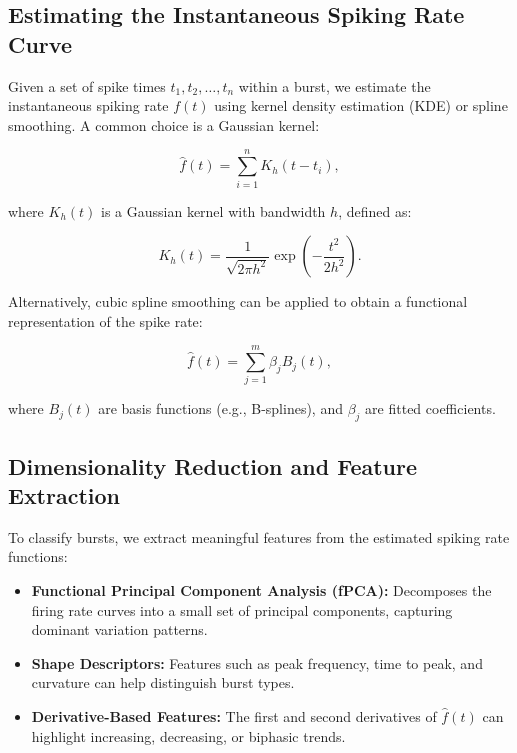 \documentclass[a4paper,9pt]{extarticle}
\begin{document}
\subsection{Estimating the Instantaneous Spiking Rate Curve}

Given a set of spike times \( t_1, t_2, \dots, t_n \) within a burst, we estimate the instantaneous spiking rate \( f(t) \) using kernel density estimation (KDE) or spline smoothing. A common choice is a Gaussian kernel:

\begin{equation}
    \hat{f}(t) = \sum_{i=1}^{n} K_h (t - t_i),
\end{equation}

where \( K_h (t) \) is a Gaussian kernel with bandwidth \( h \), defined as:

\begin{equation}
    K_h (t) = \frac{1}{\sqrt{2\pi h^2}} \exp\left(-\frac{t^2}{2h^2}\right).
\end{equation}

Alternatively, cubic spline smoothing can be applied to obtain a functional representation of the spike rate:

\begin{equation}
    \hat{f}(t) = \sum_{j=1}^{m} \beta_j B_j(t),
\end{equation}

where \( B_j(t) \) are basis functions (e.g., B-splines), and \( \beta_j \) are fitted coefficients.

\subsection{Dimensionality Reduction and Feature Extraction}

To classify bursts, we extract meaningful features from the estimated spiking rate functions:

\begin{itemize}
    \item \textbf{Functional Principal Component Analysis (fPCA):} Decomposes the firing rate curves into a small set of principal components, capturing dominant variation patterns.
    \item \textbf{Shape Descriptors:} Features such as peak frequency, time to peak, and curvature can help distinguish burst types.
    \item \textbf{Derivative-Based Features:} The first and second derivatives of \( \hat{f}(t) \) can highlight increasing, decreasing, or biphasic trends.
\end{itemize}
\end{document}
